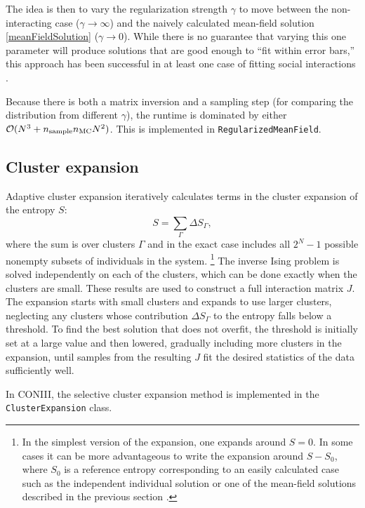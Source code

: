 \documentclass[aps,prl,twocolumn]{revtex4-1}
\begin{document}
The idea is then to vary the regularization strength $\gamma$ to move between the
non-interacting case ($\gamma \rightarrow \infty$) and the naively calculated
mean-field solution \eqref{meanFieldSolution} ($\gamma \rightarrow 0$).
While there is no guarantee that varying this one parameter will produce solutions that are
good enough to ``fit within error bars,'' this approach has been successful in at least
one case of fitting social interactions \cite{DanKraFla17}.

Because there is both a matrix inversion and a sampling step (for comparing the distribution from different $\gamma$), the runtime is dominated by either $\mathcal{O}(N^3 + n_{\rm sample}n_{\rm MC}N^2)$.
This is implemented in {\tt RegularizedMeanField}.



\subsection{Cluster expansion}
Adaptive cluster expansion \cite{CocMon11,CocMon12,BarCoc13}
iteratively calculates terms in the
cluster expansion of the entropy $S$:
\begin{equation}
S = \sum_\Gamma \Delta S_\Gamma,
\end{equation}
where the sum is over clusters $\Gamma$ and in the exact case
includes all $2^N - 1$ possible nonempty subsets of individuals in the system.
\footnote{In the simplest version of the expansion,
one expands around $S=0$.  In some cases it can be more advantageous to write the
expansion around $S-S_0$, where $S_0$ is a reference entropy corresponding to
an easily calculated case such as
the independent individual solution or one of the mean-field solutions
described in the previous section \cite{BarCoc13}.}
The inverse Ising problem is solved independently
on each of the clusters, which can be done exactly when the
clusters are small.  These results are used to construct a full
interaction matrix $J$.
The expansion starts with small clusters and expands to use larger
clusters, neglecting any clusters whose
contribution $\Delta S_\Gamma$ to the entropy falls below a threshold.
To find the best solution that does not overfit,
the threshold is initially set at a large value and then lowered,
gradually including more clusters in the expansion, until samples from
the resulting $J$ fit the desired statistics of the data sufficiently well.

In CONIII, the selective cluster expansion method is implemented in the {\tt ClusterExpansion} class.
\end{document}
